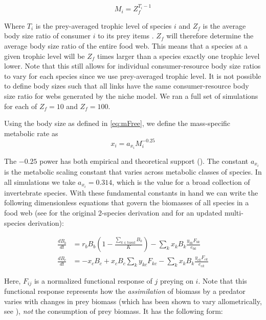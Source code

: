\documentclass[/home/nkappler/Research/Dissertation/dissertation.tex]{subfiles}
\begin{document}
\begin{bibunit}
\begin{equation}
    M_i= Z_{\!f}^{T_i-1}\label{eq:mFree}
\end{equation}

Where $T_i$ is the prey-averaged trophic level of species $i$ and $Z_{\!f}$ is
the average body size ratio of consumer $i$ to its prey items
\cite*{Williams2004}. $Z_{\!f}$ will therefore determine the average body size
ratio of the entire food web. This means that a species at a given trophic
level will be $Z_{\!f}$ times larger than a species exactly one trophic level
lower. Note that this still allows for individual consumer-resource body size
ratios to vary for each species since we use prey-averaged trophic level. It is
not possible to define body sizes such that all links have the same
consumer-resource body size ratio for webs generated by the niche model. We ran
a full set of simulations for each of $Z_{\!f} = 10$ and $Z_{\!f} = 100$. 

Using the body size as defined in \eqref{eq:mFree}, we define the mass-specific metabolic rate as
\begin{equation}
x_i = a_{x_i} M_i^{-0.25}\label{eq:x}
\end{equation}

The $-0.25$ power has both empirical and theoretical support
(\cite*{Brown2004, West1997}). The constant $a_{x_i}$ is the metabolic scaling
constant that varies across metabolic classes of species. In all simulations we
take $a_{x_i}=0.314$, which is the value for a broad collection of invertebrate
species. With these fundamental constants in hand we can write the following
dimensionless equations that govern the biomasses of all species in a food web
(see \cite*{Yodzis1992} for the original 2-species derivation and
\cite*{Williams2007} for an updated multi-species derivation): 

\begin{subequations}\label{eq:atn0}
\begin{align}
\frac{dB_{b}}{dt} &= r_bB_b\left(1-\frac{\sum_{k\in\text{basal}}B_k}{K}\right) - \sum_kx_kB_k\frac{y_{bk}F_{bk}}{e_{bk}}\label{subeq:basal0} \\ 
\frac{dB_{c}}{dt} &= -x_cB_c + x_cB_c\sum_ky_{kc}F_{kc} - \sum_k x_kB_k\frac{y_{ck}F_{ck}}{e_{ck}} \label{subeq:con0}
\end{align}
\end{subequations}

Here, $F_{ij}$ is a normalized functional response of $j$ preying on $i$. Note
that this functional response represents how the \textit{assimilation} of
biomass by a predator varies with changes in prey biomass (which has been shown
to vary allometrically, see \cite*{Brown2004}), \textit{not} the consumption of
prey biomass. It has the following form:


\end{bibunit}
\end{document}
